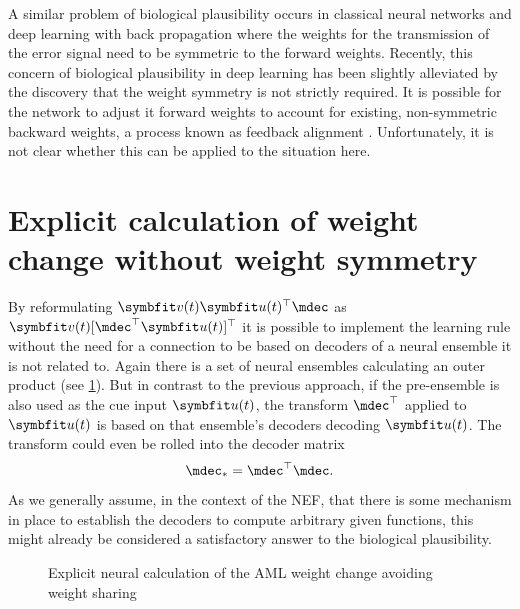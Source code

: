 A similar problem of biological plausibility occurs in classical neural networks and deep learning with back propagation where the weights for the transmission of the error signal need to be symmetric to the forward weights.
Recently, this concern of biological plausibility in deep learning has been slightly alleviated by the discovery that the weight symmetry is not strictly required.
It is possible for the network to adjust it forward weights to account for existing, non-symmetric backward weights, a process known as feedback alignment \parencite{lillicrap2016}.
Unfortunately, it is not clear whether this can be applied to the situation here.


\section{Explicit calculation of weight change without weight symmetry}
By reformulating $\vc v(t) \vc u(t)\Tr \mdec$ as $\vc v(t)[\mdec\Tr \vc u(t)]\Tr$ it is possible to implement the learning rule without the need for a connection to be based on decoders of a neural ensemble it is not related to.
Again there is a set of neural ensembles calculating an outer product (see \cref{fig:aml-explicit-no-sym}).
But in contrast to the previous approach, if the pre-ensemble is also used as the cue input $\vc u(t)$, the transform $\mdec\Tr$ applied to $\vc u(t)$ is based on that ensemble's decoders decoding $\vc u(t)$.
The transform could even be rolled into the decoder matrix
\begin{equation}
    \mdec_{*} = \mdec\Tr \mdec \text{.}
\end{equation}
As we generally assume, in the context of the NEF, that there is some mechanism in place to establish the decoders to compute arbitrary given functions, this might already be considered a satisfactory answer to the biological plausibility.
\begin{figure}
    \centering
    \caption{Explicit neural calculation of the AML weight change avoiding weight sharing}\label{fig:aml-explicit-no-sym}
\end{figure}

